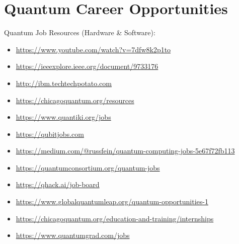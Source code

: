 \chapter{\LARGE{Quantum Career Opportunities}}

\begin{flushleft}
\large{Quantum Job Resources (Hardware \& Software):}
\end{flushleft}

\large\begin{itemize}
\item\url{https://www.youtube.com/watch?v=7dfw8k2p1to}
\item\url{https://ieeexplore.ieee.org/document/9733176}
\item\url{http://ibm.techtechpotato.com}
\item\url{https://chicagoquantum.org/resources} 
\item\url{https://www.quantiki.org/jobs} 
\item\url{https://qubitjobs.com} 
\item\url{https://medium.com/@russfein/quantum-computing-jobs-5e67f72fb113} 
\item\url{https://quantumconsortium.org/quantum-jobs} 
\item\url{https://qhack.ai/job-board}  
\item\url{https://www.globalquantumleap.org/quantum-opportunities-1} 
\item\url{https://chicagoquantum.org/education-and-training/internships} 
\item\url{https://www.quantumgrad.com/jobs}

\end{itemize}